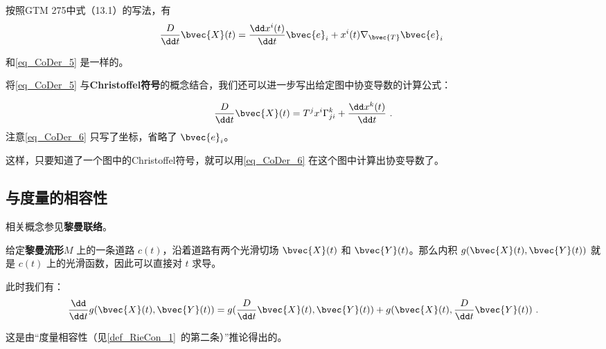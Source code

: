按照GTM 275中式（13.1）的写法，有
\begin{equation}
\frac{D}{\dd t}\bvec{X}(t)=\frac{\dd x^i(t)}{\dd t}\bvec{e}_i+{x}^i(t)\nabla_{\bvec{T}}\bvec{e}_i~
\end{equation}

和\autoref{eq_CoDer_5} 是一样的。

将\autoref{eq_CoDer_5} 与\textbf{Christoffel符号}的概念结合，我们还可以进一步写出给定图中协变导数的计算公式：

\begin{equation}\label{eq_CoDer_6}
\frac{D}{\dd t}\bvec{X}(t)=T^jx^i\Gamma^k_{ji}+\frac{\dd x^k(t)}{\dd t}~.
\end{equation}
注意\autoref{eq_CoDer_6} 只写了坐标，省略了 $\bvec{e}_i$。

这样，只要知道了一个图中的Christoffel符号，就可以用\autoref{eq_CoDer_6} 在这个图中计算出协变导数了。

\subsection{与度量的相容性}

相关概念参见\textbf{黎曼联络}。

\begin{theorem}{}
给定\textbf{黎曼流形}$M$ 上的一条道路 $c(t)$，沿着道路有两个光滑切场 ${\bvec{X}}(t)$ 和 ${\bvec{Y}}(t)$。那么内积 $g({\bvec{X}}(t), {\bvec{Y}}(t))$ 就是 $c(t)$ 上的光滑函数，因此可以直接对 $t$ 求导。

此时我们有：
\begin{equation}
\frac{\dd}{\dd t}g({\bvec{X}}(t), {\bvec{Y}}(t))=g(\frac{D}{\dd t}{\bvec{X}}(t), {\bvec{Y}}(t))+g({\bvec{X}}(t), \frac{D}{\dd t}{\bvec{Y}}(t))~.
\end{equation}
\end{theorem}



这是由“度量相容性（见\autoref{def_RieCon_1}~的第二条）”推论得出的。










